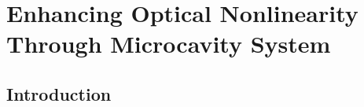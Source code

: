 
\renewcommand{\thechapter}{6}

\chapter{Enhancing Optical Nonlinearity Through Microcavity System }
\label{chap6}

\section{Introduction}

